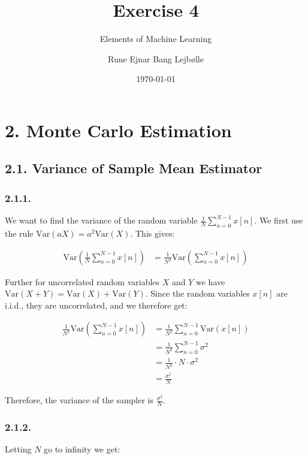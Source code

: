 \documentclass[a4paper, 12pt]{article}
\author{Rune Ejnar Bang Lejbølle}
\title{Exercise 4}
\subtitle{Elements of Machine Learning}
\date{\today}
\begin{document}
	
\maketitle

\section{2. Monte Carlo Estimation}

\subsection{2.1. Variance of Sample Mean Estimator}

\subsubsection{2.1.1.}


We want to find the variance of the random variable $\frac{1}{N} \sum_{n=0}^{N-1} x[n]$.
We first use the rule $\text{Var}(aX) = a^2 \text{Var}(X)$. This gives:

\begin{align}
	\text{Var}\left(\frac{1}{N} \sum_{n=0}^{N-1} x[n]\right) &= \frac{1}{N^2} \text{Var}\left(\sum_{n=0}^{N-1} x[n]\right)
\end{align}

Further for uncorrelated random variables $X$ and $Y$ we have $\text{Var}(X + Y) = \text{Var}(X) + \text{Var}(Y)$. Since the random variables $x[n]$ are i.i.d., they are uncorrelated, and we therefore get:

\begin{align}
	\frac{1}{N^2} \text{Var}\left(\sum_{n=0}^{N-1} x[n]\right) &= \frac{1}{N^2} \sum_{n=0}^{N-1} \text{Var}\left(x[n]\right)\\
	&= \frac{1}{N^2} \sum_{n=0}^{N-1} \sigma^2\\
	&= \frac{1}{N^2} \cdot N \cdot \sigma^2\\
	&= \frac{\sigma^2}{N}
\end{align}

Therefore, the variance of the sampler is $\frac{\sigma^2}{N}$.

\subsubsection{2.1.2.}


Letting $N$ go to infinity we get:
\end{document}
